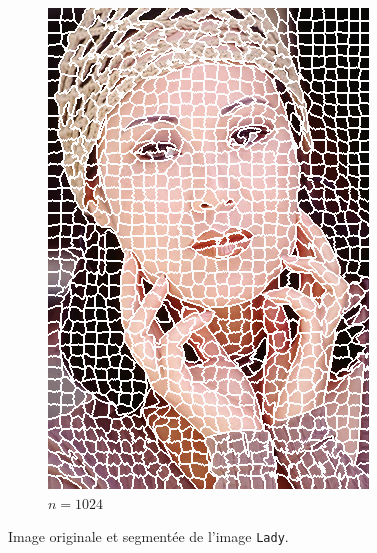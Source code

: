 \documentclass[12pt]{article}
\begin{document}
\begin{figure}
\begin{subfigure}{0.48\textwidth}
    \includegraphics[width=.8\textwidth]{lady/lady_segmented_1024.png}
    \caption{$n=1024$}
  \end{subfigure}
  \caption{Image originale et segment\'ee de l'image \texttt{Lady}.}
  \label{fig:lady_segm}
\end{figure}
\end{document}
